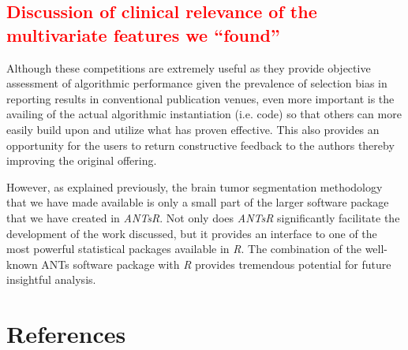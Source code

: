 \documentclass[final,5p,times,twocolumn]{elsarticle}
\begin{document}
\textcolor{red}{\subsection{Discussion of clinical relevance of the multivariate
  features we ``found''}}

Although these competitions are extremely useful as they provide objective
assessment of algorithmic performance given the prevalence of selection bias
in reporting results in conventional publication venues, even more important
is the availing of the actual algorithmic instantiation (i.e. code) so that
others can more easily build upon and utilize what has proven effective. 
This also provides an opportunity for the users to return
constructive feedback to the authors thereby improving the original offering.  

However, as explained previously, the brain tumor segmentation 
methodology that we have made available is only a small part of the 
larger software package that we have created in \textit{ANTsR}.  Not only does
\textit{ANTsR} significantly facilitate the development of the work discussed,
but it provides an interface to one of the most powerful statistical
packages available in \textit{R}.  The combination of the well-known ANTs software
package with \textit{R} provides tremendous potential for future insightful analysis.





\section*{References}










\end{document}
